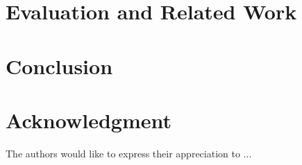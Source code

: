\documentclass [a4paper,final,conference,10pt]{IDAACS}
\begin{document}

\section{Evaluation and Related Work}
\label{sec:eval}

\section{Conclusion}
\label{sec:concl}

\section*{Acknowledgment}
The authors would like to express their appreciation to ...
\enlargethispage{-7in}



\end{document}
